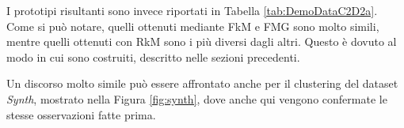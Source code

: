 \documentclass[12pt]{article}
\begin{document}
I prototipi risultanti sono invece riportati in Tabella \ref{tab:DemoDataC2D2a}. Come si può notare, quelli ottenuti mediante FkM e FMG sono molto simili, mentre quelli ottenuti con RkM sono i più diversi dagli altri. Questo è dovuto al modo in cui sono costruiti, descritto nelle sezioni precedenti.

\begin{table}[h]
	\caption{Prototipi del Dataset \textit{DemoDataC2D2a}}
	\label{tab:DemoDataC2D2a}
\end{table}

Un discorso molto simile può essere affrontato anche per il clustering del dataset \textit{Synth}, mostrato nella Figura \ref{fig:synth}, dove anche qui vengono confermate le stesse osservazioni fatte prima.
\end{document}
